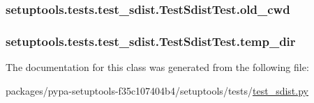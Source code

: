 \subsubsection[{old\+\_\+cwd}]{\setlength{\rightskip}{0pt plus 5cm}setuptools.\+tests.\+test\+\_\+sdist.\+Test\+Sdist\+Test.\+old\+\_\+cwd}\label{classsetuptools_1_1tests_1_1test__sdist_1_1TestSdistTest_a329a2d364ef525124cf5710d4f383ad7}
\hypertarget{classsetuptools_1_1tests_1_1test__sdist_1_1TestSdistTest_af4b539f043c28d3de4d62be1ca4b965d}{}
\subsubsection[{temp\+\_\+dir}]{\setlength{\rightskip}{0pt plus 5cm}setuptools.\+tests.\+test\+\_\+sdist.\+Test\+Sdist\+Test.\+temp\+\_\+dir}\label{classsetuptools_1_1tests_1_1test__sdist_1_1TestSdistTest_af4b539f043c28d3de4d62be1ca4b965d}


The documentation for this class was generated from the following file\+:\begin{DoxyCompactItemize}
\item 
packages/pypa-\/setuptools-\/f35c107404b4/setuptools/tests/\hyperlink{test__sdist_8py}{test\+\_\+sdist.\+py}\end{DoxyCompactItemize}
